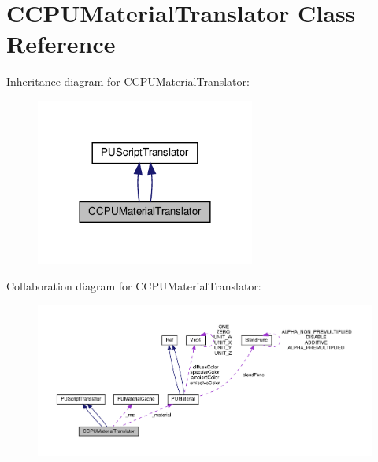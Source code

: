 \hypertarget{classCCPUMaterialTranslator}{}\section{C\+C\+P\+U\+Material\+Translator Class Reference}
\label{classCCPUMaterialTranslator}


Inheritance diagram for C\+C\+P\+U\+Material\+Translator\+:
\nopagebreak
\begin{figure}[H]
\begin{center}
\leavevmode
\includegraphics[width=204pt]{classCCPUMaterialTranslator__inherit__graph}
\end{center}
\end{figure}


Collaboration diagram for C\+C\+P\+U\+Material\+Translator\+:
\nopagebreak
\begin{figure}[H]
\begin{center}
\leavevmode
\includegraphics[width=350pt]{classCCPUMaterialTranslator__coll__graph}
\end{center}
\end{figure}
